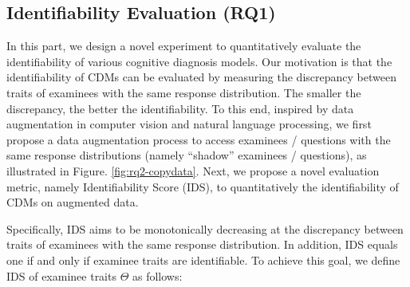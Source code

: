 \documentclass[sigconf]{acmart}
\begin{document}
\vspace{-10pt}
\subsection{Identifiability Evaluation (RQ1)}
\par In this part, we design a novel experiment to quantitatively evaluate the identifiability of various cognitive diagnosis models. Our motivation is that the identifiability of CDMs can be evaluated by measuring the discrepancy between traits of examinees with the same response distribution. The smaller the discrepancy, the better the identifiability. To this end, inspired by data augmentation in computer vision and natural language processing\cite{ghiasi2021augmentation,bayer2023augmentation}, we first propose a data augmentation process to access examinees / questions with the same response distributions (namely ``shadow'' examinees / questions), as illustrated in Figure. \ref{fig:rq2-copydata}. Next, we propose a novel evaluation metric, namely Identifiability Score (IDS), to quantitatively the identifiability of CDMs on augmented data.

\par Specifically, IDS aims to be monotonically decreasing at the discrepancy between traits of examinees with the same response distribution. In addition, IDS equals one if and only if examinee traits are identifiable. To achieve this goal, we define IDS of examinee traits $\Theta$ as follows:
\end{document}
